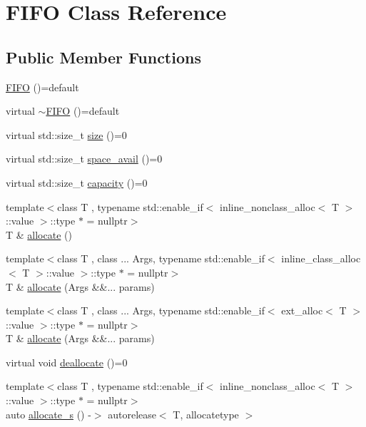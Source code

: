 \hypertarget{class_f_i_f_o}{}\section{F\+I\+FO Class Reference}
\label{class_f_i_f_o}
\subsection*{Public Member Functions}
\begin{DoxyCompactItemize}
\item 
\hyperlink{class_f_i_f_o_a200f4cf6db6b1994331ee4e0b2a594b1}{F\+I\+FO} ()=default
\item 
virtual \hyperlink{class_f_i_f_o_a75da1c02fbe46eb47f948f37d063dabf}{$\sim$\+F\+I\+FO} ()=default
\item 
virtual std\+::size\+\_\+t \hyperlink{class_f_i_f_o_ae80b8555fc249168560c67cd0a13e574}{size} ()=0
\item 
virtual std\+::size\+\_\+t \hyperlink{class_f_i_f_o_ac34aa9afd24e536aad0a9553863b6fe6}{space\+\_\+avail} ()=0
\item 
virtual std\+::size\+\_\+t \hyperlink{class_f_i_f_o_a64565d7156f6796ff14c3033387043b1}{capacity} ()=0
\item 
{\footnotesize template$<$class T , typename std\+::enable\+\_\+if$<$ inline\+\_\+nonclass\+\_\+alloc$<$ T $>$\+::value $>$\+::type $\ast$  = nullptr$>$ }\\T \& \hyperlink{class_f_i_f_o_a43ad12d67e3611fafae4d6ed862c60b9}{allocate} ()
\item 
{\footnotesize template$<$class T , class ... Args, typename std\+::enable\+\_\+if$<$ inline\+\_\+class\+\_\+alloc$<$ T $>$\+::value $>$\+::type $\ast$  = nullptr$>$ }\\T \& \hyperlink{class_f_i_f_o_af3ebfa2420677b5225794a361aa8dccc}{allocate} (Args \&\&... params)
\item 
{\footnotesize template$<$class T , class ... Args, typename std\+::enable\+\_\+if$<$ ext\+\_\+alloc$<$ T $>$\+::value $>$\+::type $\ast$  = nullptr$>$ }\\T \& \hyperlink{class_f_i_f_o_af3ebfa2420677b5225794a361aa8dccc}{allocate} (Args \&\&... params)
\item 
virtual void \hyperlink{class_f_i_f_o_af37b9a289093791f4bb9e4ef4e4e271a}{deallocate} ()=0
\item 
{\footnotesize template$<$class T , typename std\+::enable\+\_\+if$<$ inline\+\_\+nonclass\+\_\+alloc$<$ T $>$\+::value $>$\+::type $\ast$  = nullptr$>$ }\\auto \hyperlink{class_f_i_f_o_a9033768546db45b5f06103d32fec4b65}{allocate\+\_\+s} () -\/$>$ autorelease$<$ T, allocatetype $>$

\end{DoxyCompactItemize}
